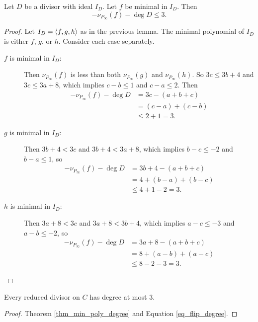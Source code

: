 \begin{theorem}
  \label{thm_min_poly_degree}
  Let $D$ be a divisor with ideal $I_D$.
  Let $f$ be minimal in $I_D$. Then
  \[ -\nu_{P_\infty}(f) - \deg D \leq 3. \]
\end{theorem}
\begin{proof}
  Let $I_D = \left\langle f, g, h \right\rangle$ as in the previous lemma.
  The minimal polynomial of $I_D$ is either $f$, $g$, or $h$.
  Consider each case separately.
  \begin{description}
    \item[$f$ is minimal in $I_D$:]
      Then $\nu_{P_\infty}(f)$ is less than both $\nu_{P_\infty}(g)$ and $\nu_{P_\infty}(h)$.
      So $3c \leq 3b + 4$ and $3c \leq 3a + 8$, which implies
      $c - b \leq 1$ and $c - a \leq 2$. Then
      \begin{align*}
        -\nu_{P_\infty}(f) - \deg D
          &= 3c - (a + b + c) \\
          &= (c - a) + (c - b) \\
          &\leq 2 + 1 = 3.
      \end{align*}
      
    \item[$g$ is minimal in $I_D$:]
      Then $3b + 4 < 3c$ and $3b + 4 < 3a + 8$,
      which implies $b - c \leq -2$ and $b - a \leq 1$, so
      \begin{align*}
        -\nu_{P_\infty}(f) - \deg D
          &= 3b + 4 - (a + b + c) \\
          &= 4 + (b - a) + (b - c) \\
          &\leq 4 + 1 - 2 = 3.
      \end{align*}

    \item[$h$ is minimal in $I_D$:]
      Then $3a + 8 < 3c$ and $3a + 8 < 3b + 4$,
      which implies $a - c \leq -3$ and $a - b \leq -2$, so
      \begin{align*}
        -\nu_{P_\infty}(f) - \deg D
          &= 3a + 8 - (a + b + c) \\
          &= 8 + (a - b) + (a - c) \\
          &\leq 8 - 2 - 3 = 3.
      \end{align*}
  \end{description}
\end{proof}

\begin{theorem}
  \label{thm_reduced_divisor_degree}
  Every reduced divisor on $C$ has degree at most 3.
\end{theorem}
\begin{proof}
  Theorem \ref{thm_min_poly_degree} and Equation \ref{eq_flip_degree}.
\end{proof}
